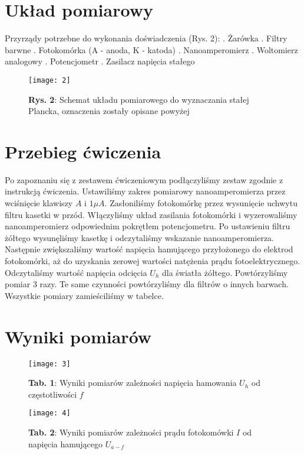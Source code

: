 \documentclass[12pt]{article}
\begin{document}
\section{Układ pomiarowy}
Przyrządy potrzebne do wykonania doświadczenia (Rys. 2): . Żarówka . Filtry barwne . Fotokomórka (A - anoda, K - katoda) . Nanoamperomierz . Woltomierz analogowy . Potencjometr . Zasilacz napięcia stałego \newline
\begin{figure}[H]
\centering
\texttt{[image: 2]}
\caption*{\textbf{Rys. 2}: Schemat układu pomiarowego do wyznaczania stałej Plancka, oznaczenia zostały opisane powyżej}
\end{figure} 
\section{Przebieg ćwiczenia}
Po zapoznaniu się z zestawem ćwiczeniowym podłączyliśmy zestaw zgodnie z instrukcją ćwiczenia. Ustawiliśmy zakres pomiarowy nanoamperomierza przez wciśnięcie klawiszy $A$ i $1\mu{A}$. Zasłoniliśmy fotokomórkę przez wysunięcie uchwytu filtru kasetki w przód. Włączyliśmy układ zasilania fotokomórki i wyzerowaliśmy nanoamperomierz odpowiednim pokrętłem potencjometru. Po ustawieniu filtru żółtego wysunęliśmy kasetkę i odczytaliśmy wskazanie nanoamperomierza. Następnie zwiększaliśmy wartość napięcia hamującego przyłożonego do elektrod fotokomórki, aż do uzyskania zerowej wartości natężenia prądu fotoelektrycznego. Odczytaliśmy wartość napięcia odcięcia $U_h$ dla światła żółtego. Powtórzyliśmy pomiar $3$ razy. Te same czynności powtórzyliśmy dla filtrów o innych barwach. Wszystkie pomiary zamieściliśmy w tabelce. \newpage
\section{Wyniki pomiarów}
\begin{figure}[H]
\centering
\texttt{[image: 3]}
\caption*{\textbf{Tab. 1}: Wyniki pomiarów zależności napięcia hamowania $U_h$ od częstotliwości $f$}
\end{figure} 
\begin{figure}[H]
\centering
\texttt{[image: 4]}
\caption*{\textbf{Tab. 2}: Wyniki pomiarów zależności prądu fotokomówki $I$ od napięcia hamującego $U_{a-f}$}
\end{figure} 
\end{document}
